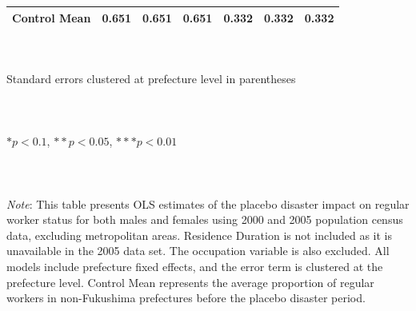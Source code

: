 \documentclass[serif, aspectratio=169]{beamer}
\begin{document}
\begin{frame}[label=regular_placebo]
\begin{table}[htbp]
\begin{tabular}{@{}l*{6}{c}@{}}
Control Mean&    0.651         &    0.651         &    0.651         &    0.332         &    0.332         &    0.332         \\
\bottomrule
\end{tabular}
\\\\{\linewidth}{\tiny Standard errors clustered at prefecture level in parentheses}\\\\
\\\\{\linewidth}{\tiny $*p<0.1$, $**p<0.05$, $***p<0.01$}\\\\
\\\\{\linewidth}{\tiny \textit{Note}: This table presents OLS estimates of the placebo disaster impact on regular worker status for both males and females using 2000 and 2005 population census data, excluding metropolitan areas. Residence Duration is not included as it is unavailable in the 2005 data set. The occupation variable is also excluded. All models include prefecture fixed effects, and the error term is clustered at the prefecture level. Control Mean represents the average proportion of regular workers in non-Fukushima prefectures before the placebo disaster period.}
\end{table}


\end{frame}





\end{document}
